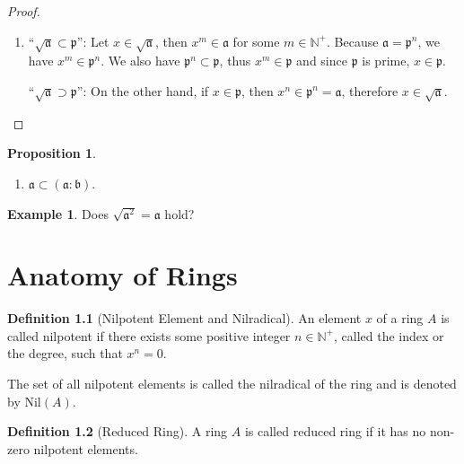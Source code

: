\documentclass[a4paper]{book}
\theoremstyle{definition}
\newtheorem{definition}{Definition}[]
\newtheorem{example}{Example}[definition]
\newtheorem{proposition}[definition]{Proposition}
\begin{document}
\begin{proof}
\begin{enumerate}
        \item ``\(\sqrt{\mathfrak{a}} \subset \mathfrak{p}\)'': Let \(x \in \sqrt{\mathfrak{a}}\), then \(x^m \in \mathfrak{a}\) for some \(m \in \mathbb{N}^+\). Because \(\mathfrak{a} = \mathfrak{p}^n\), we have \(x^m \in \mathfrak{p}^n\). We also have \(\mathfrak{p}^n \subset \mathfrak{p}\), thus \(x^m \in \mathfrak{p}\) and since \(\mathfrak{p}\) is prime, \(x \in \mathfrak{p}\).
        
        ``\(\sqrt{\mathfrak{a}} \supset \mathfrak{p}\)'': On the other hand, if \(x \in \mathfrak{p}\), then \(x^n \in \mathfrak{p}^n = \mathfrak{a}\), therefore \(x \in \sqrt{\mathfrak{a}}\).
    \end{enumerate}
\end{proof}

\begin{thmbox}
    \begin{proposition}
        \begin{enumerate}
            \item \(\mathfrak{a} \subset (\mathfrak{a} : \mathfrak{b})\).
        \end{enumerate}
    \end{proposition}
\end{thmbox}

\begin{exmbox}
    \begin{example}
        Does \(\sqrt{\mathfrak{a}^2} = \mathfrak{a}\) hold?
    \end{example}
\end{exmbox}

\chapter{Anatomy of Rings}

\begin{defbox}
    \begin{definition}[Nilpotent Element and Nilradical]
        An element \(x\) of a ring \(A\) is called nilpotent if there exists some positive integer \(n \in \mathbb{N}^+\), called the index or the degree, such that \(x^n = 0\).

        The set of all nilpotent elements is called the nilradical of the ring and is denoted by \(\mathrm{Nil}(A)\).
    \end{definition}
\end{defbox}

\begin{defbox}
    \begin{definition}[Reduced Ring]
        A ring \(A\) is called reduced ring if it has no non-zero nilpotent elements.
    \end{definition}
\end{defbox}
\end{document}
